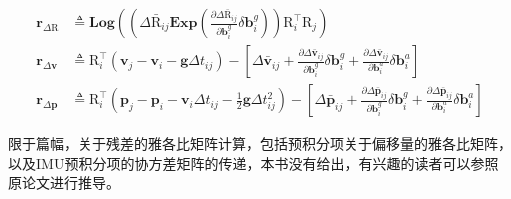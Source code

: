 \begin{equation}
\begin{aligned}
  \mathbf{r}_{\Delta\mathrm{R}}
    &\triangleq
      \bm{Log}\left(
        \left(
          \Delta\bar{\mathrm R}_{ij}
          \bm{Exp}\left(
            \frac{\partial\Delta\bar{\mathrm R}_{ij}}{\partial\mathbf{b}^g_i}
            \delta\mathbf{b}^g_i\right)
        \right) \mathrm{R}^\top_i \mathrm{R}_j
      \right) \\
  \mathbf{r}_{\Delta\mathbf{v}}
    &\triangleq
      \mathrm{R}^\top_i(\mathbf{v}_j - \mathbf{v}_i - \mathbf{g}\Delta t_{ij}) -
      \left[
        \Delta\bar{\mathbf v}_{ij} +
        \tfrac{\partial\Delta\bar{\mathbf v}_{ij}}{\partial\mathbf{b}^g_i}
        \delta\mathbf{b}^g_i +
        \tfrac{\partial\Delta\bar{\mathbf v}_{ij}}{\partial\mathbf{b}^a_i}
        \delta\mathbf{b}^a_i
      \right] \\
  \mathbf{r}_{\Delta\mathbf{p}}
    &\triangleq
      \mathrm{R}^\top_i(
        \mathbf{p}_j - \mathbf{p}_i -
        \mathbf{v}_i \Delta t_{ij} -
        \frac{1}{2}\mathbf{g}\Delta t^2_{ij}) -
      \left[
        \Delta\bar{\mathbf p}_{ij} +
        \tfrac{\partial\Delta\bar{\mathbf p}_{ij}}{\partial\mathbf{b}^g_i}
        \delta\mathbf{b}^g_i +
        \tfrac{\partial\Delta\bar{\mathbf p}_{ij}}{\partial\mathbf{b}^a_i}
        \delta\mathbf{b}^a_i \right]
\end{aligned}
\end{equation}

限于篇幅，关于残差的雅各比矩阵计算，包括预积分项关于偏移量的雅各比矩阵，以及IMU预积分项的协方差矩阵的传递，本书没有给出，有兴趣的读者可以参照原论文进行推导。

